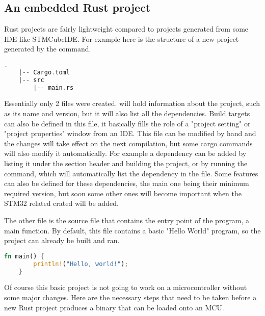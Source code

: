 \subsection{An embedded Rust project}

Rust projects are fairly lightweight compared to projects generated from some IDE like STMCubeIDE. For example here is the structure of a new project generated by the  command.

\begin{lstlisting}[language=C,frame=single,float=!ht,label={lst:rust-project-structure},caption={Rust Project Structure}]
    .
    |-- Cargo.toml
    |-- src
        |-- main.rs

\end{lstlisting}

Essentially only 2 files were created.  will hold information about the project, such as its name and version, but it will also list all the dependencies. Build targets can also be defined in this file, it basically fills the role of a "project setting" or "project properties" window from an IDE. This file can be modified by hand and the changes will take effect on the next compilation, but some cargo commands will also modify it automatically. For example a dependency can be added by listing it under the \mycode{[dependencies]} section header and building the project, or by running the  command, which will automatically list the dependency in the file. Some features can also be defined for these dependencies, the main one being their minimum required version, but soon some other ones will become important when the STM32 related crated will be added.

The other file is the  source file that contains the entry point of the program, a main function. By default, this file contains a basic "Hello World" program, so the project can already be built and ran.

\begin{lstlisting}[language=Rust,frame=single,float=!ht,style=customrust,label={lst:rust-hello-world},caption={Rust Hello World Porgram}]
    fn main() {
        println!("Hello, world!");
    }
\end{lstlisting}

Of course this basic project is not going to work on a microcontroller without some major changes. Here are the necessary steps that need to be taken before a new Rust project produces a binary that can be loaded onto an MCU.

